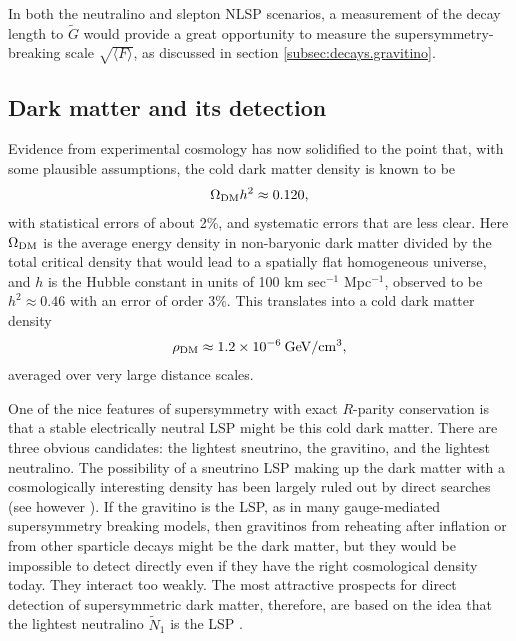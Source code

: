 \documentclass[12pt]{article}
\def\beq{\begin{eqnarray}}
\def\eeq{\end{eqnarray}}
\def\stilde{\widetilde}
\def\NI{\stilde N_1}
\begin{document}
In both the neutralino and slepton NLSP scenarios, a measurement of the 
decay length to $\stilde G$ would provide a great opportunity to measure 
the supersymmetry-breaking scale $\sqrt{\langle F \rangle}$, as discussed 
in section \ref{subsec:decays.gravitino}.

\subsection{Dark matter and its detection}\label{subsec:signals.darkmatter}
\setcounter{equation}{0}
\setcounter{footnote}{1}

Evidence from experimental cosmology has now solidified to the point that, 
with some plausible assumptions, the cold dark matter density is known to 
be \cite{cosmokramer,RPP}
\beq
\Omega_{\rm DM} h^2 \approx 0.120,
\label{eq:OmegaDM}
\eeq
with statistical errors of about 2\%, and systematic errors that are less 
clear. Here $\Omega_{\rm DM}$ is the average energy density in 
non-baryonic dark matter divided by the total critical density that would 
lead to a spatially flat homogeneous universe, and $h$ is the Hubble 
constant in units of 100 km sec$^{-1}$ Mpc$^{-1}$, observed to be $h^2 
\approx 0.46$ with an error of order 3\%. This translates into a cold dark 
matter density
\beq
\rho_{\rm DM} \approx 1.2 \times 10^{-6} \> {\rm GeV}/{\rm cm}^3 ,
\label{eq:rhodm}
\eeq 
averaged over very large distance scales.

One of the nice features of supersymmetry with exact $R$-parity 
conservation is that a stable electrically neutral LSP might be this cold 
dark matter.  There are three obvious candidates:  the lightest sneutrino, 
the gravitino, and the lightest neutralino. The possibility of a sneutrino 
LSP making up the dark matter with a cosmologically interesting density 
has been largely ruled out by direct searches \cite{sneutrinonotLSP} (see 
however \cite{sneutrinoLSP}). If the gravitino is the LSP, as in many 
gauge-mediated supersymmetry breaking models, then gravitinos from 
reheating after inflation \cite{gravitinoDMfromreheating} or from other 
sparticle decays \cite{gravitinoDMfromdecays} might be the dark matter, 
but they would be impossible to detect directly even if they have the 
right cosmological density today. They interact too weakly. The most 
attractive prospects for direct detection of supersymmetric dark matter, 
therefore, are based on the idea that the lightest neutralino $\NI$ is the 
LSP \cite{neutralinodarkmatter,darkmatterreviews}.
\end{document}
